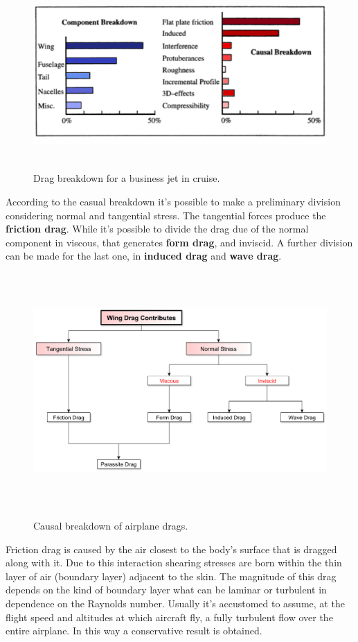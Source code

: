 \begin{figure}[H]
\centering
{\includegraphics[height=6.4cm]{Immagini/component.png}} 
\caption{Drag breakdown for a business jet in cruise.}
\end{figure}
According to the casual breakdown it's possible to make a preliminary division considering normal and tangential stress. The tangential forces produce the {\bfseries friction drag}. While it's possible to divide the drag due of the normal component in viscous, that generates {\bfseries form drag}, and inviscid. A further division can be made for the last one, in {\bfseries induced drag}  and {\bfseries wave drag}.\\
\begin{figure}[H]
\centering
{\includegraphics[height=8.9cm]{Immagini/dragcomponentlast.pdf}} 
\caption{Causal breakdown of airplane drags.}
\end{figure}
Friction drag is caused by the air closest to the body’s surface that is dragged along with it. Due to this interaction shearing stresses are born within the thin layer of air (boundary layer) adjacent to the skin. The magnitude of this drag depends on the kind of boundary layer what can be laminar or turbulent in dependence on the Raynolds number. Usually it's accustomed to assume, at the flight speed and altitudes at which aircraft fly, a fully turbulent flow over the entire airplane. In this way a conservative result is obtained.\\
